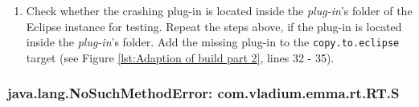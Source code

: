 \begin{description}
\begin{enumerate}
\begin{nofloat}{figure}
				\fi
				\centering
				\caption[Failed attempt of starting a plug-in]{Failed attempt of starting a plug-in via the OSGi console. The error message shows that the \textit{ReasonerCore.tests} plug-in could not be started.}
				\label{fig:Start Plug-in}
			\end{nofloat}
		\item Check whether the crashing plug-in is located inside the \textit{plug-in}'s folder of the Eclipse instance for testing. Repeat the steps above, if the plug-in is located inside the \textit{plug-in}'s folder. Add the missing plug-in to the \texttt{copy.to.eclipse} target (see Figure \vref{lst:Adaption of build part 2}, lines 32 - 35).
	\end{enumerate}
\end{description}
\newpage
\subsubsection{java.lang.NoSuchMethodError: com.vladium.emma.rt.RT.S}
\label{sec:Emma Method Error}
